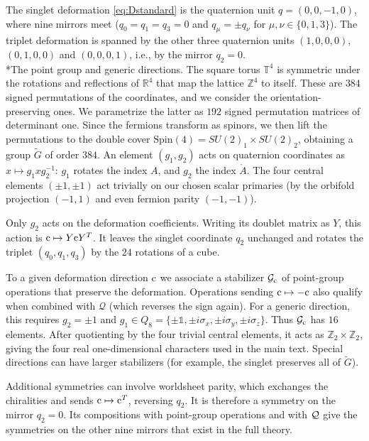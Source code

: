 \documentclass[aps,onecolumn,groupedaddress,nofootinbib,pra]{revtex4-2}
\makeatletter
\renewcommand\paragraph{\@startsection{paragraph}{4}{\parindent}{\z@}{-1em}{\normalfont\normalsize\bfseries}}
\newcommand{\Tf}{\mathbb T^4}
\newcommand{\cMat}{{\rm c}}
\newcommand{\Gt}{\widetilde G}
\newcommand{\Hc}{{\cal G}_{\cMat}}
\makeatother
\begin{document}
The singlet deformation \eqref{eq:Dstandard} is the quaternion unit $q=(0,0,-1,0)$, where nine mirrors meet ($q_0=q_1=q_3=0$ and $q_\mu=\pm q_\nu$ for $\mu,\nu\in\{0,1,3\}$). The triplet deformation \cite{Gaberdiel:2025smz} is spanned by the other three quaternion units $(1,0,0,0)$, $(0,1,0,0)$ and $(0,0,0,1)$, i.e., by the mirror $q_2=0$.\\

\paragraph*{The point group and generic directions.}
The square torus $\Tf$ is symmetric under the rotations and reflections of $\mathbb R^4$ that map the lattice $\mathbb Z^4$ to itself. These are $384$ signed permutations of the coordinates, and we consider the orientation-preserving ones. We parametrize the latter as $192$ signed permutation matrices of determinant one. Since the fermions transform as spinors, we then lift the permutations to the double cover $\mathrm{Spin}(4)=SU(2)_1\times SU(2)_2$, obtaining a group $\Gt$ of order $384$. An element $(g_1,g_2)$ acts on quaternion coordinates as $x\mapsto g_1xg_2^{-1}$: $g_1$ rotates the index $A$, and $g_2$ the index $\dot A$. The four central elements $(\pm1,\pm1)$ act trivially on our chosen scalar primaries (by the orbifold projection $(-1,1)$ and even fermion parity $(-1,-1)$).

Only $g_2$ acts on the deformation coefficients. Writing its doublet matrix as $Y$, this action is $\cMat\mapsto Y\cMat Y^T$. It leaves the singlet coordinate $q_2$ unchanged and rotates the triplet $(q_0,q_1,q_3)$ by the $24$ rotations of a cube.

To a given deformation direction $\cMat$ we associate a stabilizer $\Hc$ of point-group operations that preserve the deformation. Operations sending $\cMat \mapsto -\cMat$ also qualify when combined with $\mathcal Q$ (which reverses the sign again). For a generic direction, this requires $g_2=\pm1$ and $g_1\in Q_8 =\{\pm\mathds{1},\pm i\sigma_x,\pm i\sigma_y,\pm i\sigma_z\}$. Thus $\Hc$ has $16$ elements. After quotienting by the four trivial central elements, it acts as $\mathbb Z_2\times\mathbb Z_2$, giving the four real one-dimensional characters used in the main text. Special directions can have larger stabilizers (for example, the singlet preserves all of $\Gt$).

Additional symmetries can involve worldsheet parity, which exchanges the chiralities and sends $\cMat\mapsto\cMat^T$, reversing $q_2$. It is therefore a symmetry on the mirror $q_2=0$. Its compositions with point-group operations and with ${\cal Q}$ give the symmetries on the other nine mirrors that exist in the full theory.
\end{document}
